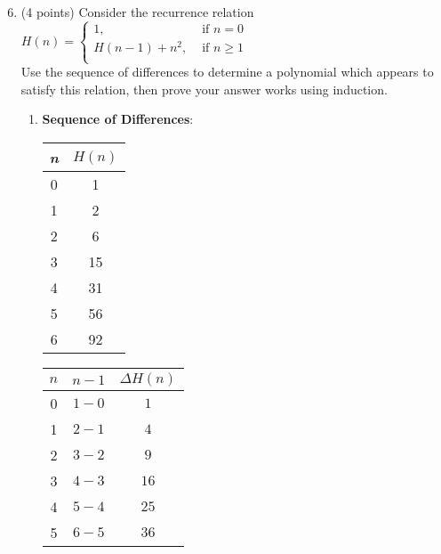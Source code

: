 \documentclass{article}
\begin{document}
\newpage

\begin{enumerate}
    \setcounter{enumi}{5}
    \item (4 points) Consider the recurrence relation $H(n) = \begin{cases}
        1, &\text{ if } n = 0 \\
        H(n-1) + n^2, &\text { if } n \geq 1 \\
    \end{cases}$ \\
    Use the sequence of differences to determine a polynomial which appears to satisfy this relation, then prove your answer works using induction. \\

    \begin{enumerate}
        \item \textbf{Sequence of Differences}:
            \begin{multicols}{3}
                \begin{center}
                    \begin{tabular}{c|c}
                        \textit{n} & \(H(n)\) \\
                        \hline
                        0 & 1 \\
                        1 & 2 \\
                        2 & 6 \\
                        3 & 15 \\
                        4 & 31 \\
                        5 & 56 \\
                        6 & 92 \\
                    \end{tabular}
                \end{center}
            
                \columnbreak

                \begin{center}

                    \begin{tabular}{c|c|c}
                        $n$ & $n-1$ & \(\Delta H(n)\) \\
                        \hline
                        0 & $1-0$ & $1$ \\
                        1 & $2-1$ & $4$ \\
                        2 & $3-2$ & $9$ \\
                        3 & $4-3$ & $16$ \\
                        4 & $5-4$ & $25$ \\
                        5 & $6-5$ & $36$ \\
                    \end{tabular}
                \end{center}
            

\end{multicols}
\end{enumerate}
\end{enumerate}
\end{document}
